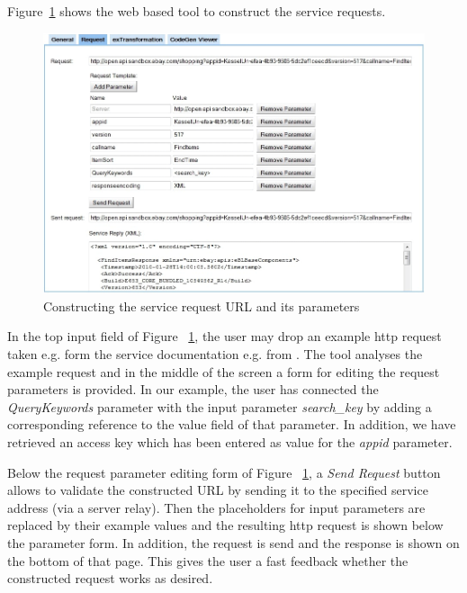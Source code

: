 Figure~\ref{fig:construct_service_request} shows the web based tool to construct the service requests.

\begin{figure}
  \begin{center}
    \includegraphics[width=\linewidth]{images/ServiceWrapperToolGVSWithRequestExample.png}
    \caption{Constructing the service request URL and its parameters}
    \label{fig:construct_service_request}
  \end{center}
\end{figure}

In the top input field of Figure ~\ref{fig:construct_service_request}, the user may drop an example http request taken e.g. form the service documentation e.g. from \cite{eBayShoppingAPIs}. The tool analyses the example request and in the middle of the screen a form for editing the request parameters is provided. In our example, the user has connected the \textit{QueryKeywords} parameter with the input parameter \textit{search\_key} by adding a corresponding reference to the value field of that parameter. In addition, we have retrieved an access key which has been entered as value for the \textit{appid} parameter.

Below the request parameter editing form of Figure ~\ref{fig:construct_service_request}, a \textit{Send Request} button allows to validate the constructed URL by sending it to the specified service address (via a server relay). Then the placeholders for input parameters are replaced by their example values and the resulting http request is shown below the parameter form. In addition, the request is send and the response is shown on the bottom of that page. This gives the user a fast feedback whether the constructed request works as desired. 

